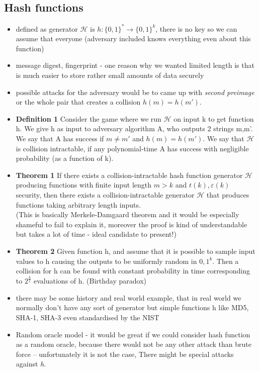\documentclass[a4paper,10pt]{article}
\begin{document}
\subsection*{Hash functions}
\begin{itemize}
\item defined as generator $\mathcal{H} \text{ is } h: \{0,1\}^* \rightarrow \{0,1\}^k$, there is no key so we can assume that everyone (adversary included knows everything even about this function)
\item message digest,  fingerprint - one reason why we wanted limited length is that is much easier to store rather small amounts of data securely
\item possible attacks for the adversary would be to came up with \textit{second preimage} or the whole pair that creates a collision $h(m)=h(m')$.
\item 
\textbf{Definition 1} Consider the game where we run $\mathcal{H}$ on input k to get function h. We give h as input to adversary algorithm A, who outputs 2 strings m,m'. We say that A has success if $m \neq m'$ and $h(m) = h(m')$. We say that $\mathcal{H}$ is collision intractable, if any polynomial-time A has success with negligible probability (as a function of k).
\item 
\textbf{Theorem 1} If there exists a collision-intractable hash function generator $\mathcal{H}$ producing functions with finite input length $m > k$ and $t(k),\varepsilon(k)$ security, then there exists a collision-intractable generator $\mathcal{H}$ that produces functions taking arbitrary length inputs.\\
(This is basically Merkele-Damgaard theorem and it would be especially shameful to fail to explain it, moreover the proof is kind of understandable but takes a lot of time - ideal candidate to present!)
\item
\textbf{Theorem 2} Given function h, and assume that it is possible to sample input values to h causing the outputs to be uniformly random in ${0,1}^k$. Then a collision for h can be found with constant probability in time corresponding to $2^{\frac{k}{2}}$ evaluations of h. (Birthday paradox)
\item there may be some history and real world example, that in real world we normally don't have any sort of generator but simple functions h like MD5, SHA-1, SHA-3 even standardised by the NIST
\item Random oracle model - it would be great if we could consider hash function as a random oracle, because there would not be any other attack than brute force  -- unfortunately it is not the case, There might be special attacks against \textit{h}.
\end{itemize}
\end{document}
